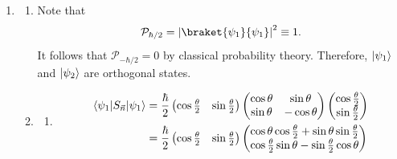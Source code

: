 \documentclass[11pt, letterpaper]{article}
\begin{document}
\begin{enumerate}
\begin{enumerate}
\begin{align*}
\begin{pmatrix}
								     \cos \theta  \\
								     \sin \theta 
								     \end{pmatrix}\\
								     &=\frac{\hbar }{2} \cos \theta 
				.\end{align*}
			\item 
				\[
					\left\langle S_{\vec{n} }  \right\rangle =\sum_{i} \lambda_i \mathcal{P}_i=\frac{\hbar }{2} \cos ^2\frac{\theta }{2}-\frac{\hbar }{2} \sin ^2\frac{\theta }{2} =\frac{\hbar }{2} \left( \cos^2\frac{\theta }{2} -\sin ^2\frac{\theta }{2}  \right) =\frac{\hbar }{2} \cos \theta 
				.\]
		\end{enumerate}
	\item
		\begin{enumerate}
			\item Note that
				\[
					\mathcal{P}_{\hbar /2} =\left| \braket{\psi _1}{\psi _1}  \right| ^2 \equiv 1
				.\]
				It follows that $\mathcal{P}_{-\hbar /2} =0$ by classical probability theory. Therefore, $\lvert\psi _1\rangle $ and $\lvert\psi _2\rangle $ are orthogonal states.
			\item
				\begin{enumerate}
					\item
						\begin{align*}
							\bra{\psi _1} S_{\vec{n} } \ket{\psi _1} &=\frac{\hbar }{2}\begin{pmatrix}
							\cos \frac{\theta }{2}  & \sin \frac{\theta }{2} 
							\end{pmatrix}\begin{pmatrix}
							\cos \theta  & \sin \theta  \\
							\sin \theta  & -\cos \theta 
							\end{pmatrix}\begin{pmatrix}
							\cos \frac{\theta }{2}  \\
							\sin \frac{\theta }{2} 
							\end{pmatrix}\\
												 &=\frac{\hbar }{2}\begin{pmatrix}
												 \cos \frac{\theta }{2}  & \sin \frac{\theta }{2} 
												 \end{pmatrix}\begin{pmatrix}
												 \cos \theta \cos \frac{\theta }{2} +\sin \theta \sin \frac{\theta }{2}  \\
												 \cos \frac{\theta }{2} \sin \theta -\sin \frac{\theta }{2} \cos \theta 
												 \end{pmatrix}\\

\end{align*}
\end{enumerate}
\end{enumerate}
\end{enumerate}
\end{document}
